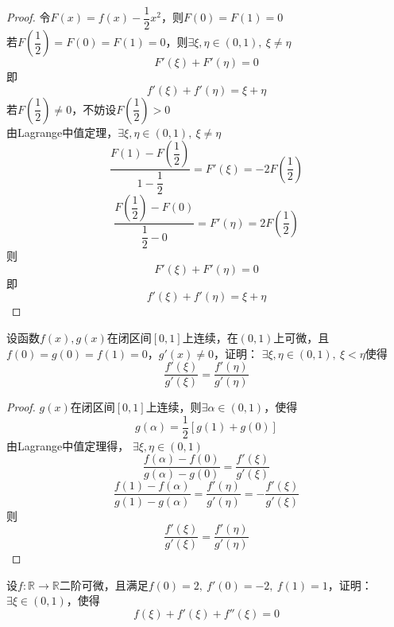 \begin{proof}

    令$F(x) = f(x) - \dfrac{1}{2}x^2$，则$F(0) = F(1) = 0$\\
    若$F\left( \dfrac{1}{2} \right) = F(0) = F(1) = 0$，则$\exists \xi,\eta \in (0,1),\ \xi \neq \eta$
    $$F'(\xi) + F'(\eta) = 0$$
    即
    $$f'(\xi) + f'(\eta) = \xi + \eta$$
    若$F\left( \dfrac{1}{2} \right) \neq 0$，不妨设$F\left( \dfrac{1}{2} \right) > 0$\\
    由\textup{Lagrange}中值定理，$\exists \xi,\eta \in (0,1),\ \xi \neq \eta$
    $$ \dfrac{F(1) - F\left( \dfrac{1}{2} \right)}{1 - \dfrac{1}{2}} = F'(\xi) = -2F\left( \dfrac{1}{2} \right)$$
    $$ \dfrac{F\left( \dfrac{1}{2} \right) - F(0)}{\dfrac{1}{2} - 0} = F'(\eta) = 2F\left( \dfrac{1}{2} \right)$$
    则
    $$F'(\xi) + F'(\eta) = 0$$
    即
    $$f'(\xi) + f'(\eta) = \xi + \eta$$

\end{proof}

\begin{proposition}

    设函数$f(x),g(x)$在闭区间$[0,1]$上连续，在$(0,1)$上可微，且$f(0) = g(0) = f(1) = 0$，$g'(x) \neq 0$，证明： $\exists \xi,\eta \in (0,1),\ \xi < \eta$使得
    $$\dfrac{f'(\xi)}{g'(\xi)} = \dfrac{f'(\eta)}{g'(\eta)}$$

\end{proposition}

\begin{proof}

    $g(x)$在闭区间$[0,1]$上连续，则$\exists \alpha \in (0,1)$，使得
    $$g(\alpha) = \dfrac{1}{2}[g(1) + g(0)]$$
    由\textup{Lagrange}中值定理得， $\exists \xi,\eta \in (0,1)$
    $$\dfrac{f(\alpha) - f(0)}{g(\alpha) - g(0)} = \dfrac{f'(\xi)}{g'(\xi)}$$
    $$\dfrac{f(1) - f(\alpha)}{g(1) - g(\alpha)} = \dfrac{f'(\eta)}{g'(\eta)} = -\dfrac{f'(\xi)}{g'(\xi)}$$
    则
    $$\dfrac{f'(\xi)}{g'(\xi)} = \dfrac{f'(\eta)}{g'(\eta)}$$

\end{proof}

\begin{proposition}

    设$f:\mathbb{R}\to\mathbb{R}$二阶可微，且满足$f(0) = 2,\ f'(0) = -2,\ f(1) = 1$，证明：$\exists \xi \in (0,1)$，使得
    $$f(\xi) + f'(\xi) + f''(\xi) = 0$$

\end{proposition}

